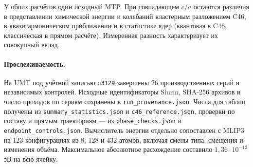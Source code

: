 У обоих расчётов один исходный MTP. При совпадающем $c/a$ остаются
различия в представлении химической энергии и колебаний
кластерным разложением C46, в квазигармоническом приближении и
в статистике ядер (квантовая в C46, классическая в прямом
расчёте). Измеренная разность характеризует их совокупный вклад.

\paragraph{Прослеживаемость.}
На UMT под учётной записью \texttt{u3129} завершены 26 производственных
серий и независимых контролей. Исходные идентификаторы Slurm,
SHA-256 архивов и число проходов по сериям сохранены в
\texttt{run\_provenance.json}. Числа для таблиц получены из
\texttt{summary\_statistics.json} и \texttt{c46\_reference.json},
проверки по составу и прямым траекториям ---
из \texttt{phase\_checks.json} и \texttt{endpoint\_controls.json}.
Вычислитель энергии отдельно сопоставлен с MLIP3 на 123 конфигурациях
из 8, 128 и 432 атомов, включая смены типа, смещения и изменения
объёма. Максимальное абсолютное расхождение составило
$1{,}36\cdot10^{-12}$ эВ на всю ячейку.
